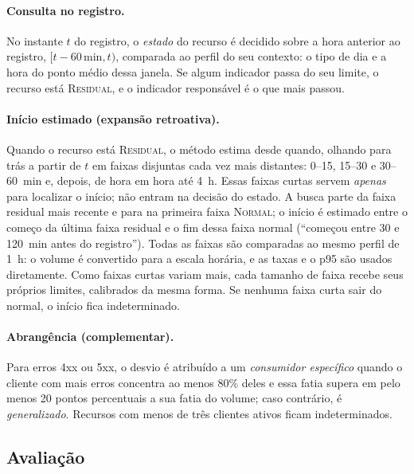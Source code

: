 \documentclass[sigconf,nonacm]{acmart}
\newcommand{\Normal}{\textsc{Normal}\xspace}
\newcommand{\Residual}{\textsc{Residual}\xspace}
\begin{document}
\paragraph{Consulta no registro.} No instante $t$ do registro, o \emph{estado} do recurso é decidido sobre a hora anterior ao registro, $[t-60\,\text{min}, t)$, comparada ao perfil do seu contexto: o tipo de dia e a hora do ponto médio dessa janela. Se algum indicador passa do seu limite, o recurso está \Residual, e o indicador responsável é o que mais passou.

\paragraph{Início estimado (expansão retroativa).} Quando o recurso está \Residual, o método estima desde quando, olhando para trás a partir de $t$ em faixas disjuntas cada vez mais distantes: 0--15, 15--30 e 30--60~min e, depois, de hora em hora até 4~h. Essas faixas curtas servem \emph{apenas} para localizar o início; não entram na decisão do estado. A busca parte da faixa residual mais recente e para na primeira faixa \Normal; o início é estimado entre o começo da última faixa residual e o fim dessa faixa normal (``começou entre 30 e 120~min antes do registro''). Todas as faixas são comparadas ao mesmo perfil de 1~h: o volume é convertido para a escala horária, e as taxas e o p95 são usados diretamente. Como faixas curtas variam mais, cada tamanho de faixa recebe seus próprios limites, calibrados da mesma forma. Se nenhuma faixa curta sair do normal, o início fica indeterminado.

\paragraph{Abrangência (complementar).} Para erros 4xx ou 5xx, o desvio é atribuído a um \emph{consumidor específico} quando o cliente com mais erros concentra ao menos 80\% deles e essa fatia supera em pelo menos 20 pontos percentuais a sua fatia do volume; caso contrário, é \emph{generalizado}. Recursos com menos de três clientes ativos ficam indeterminados.

\subsection{Avaliação}
\end{document}
